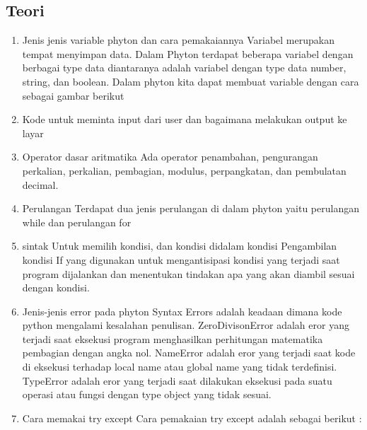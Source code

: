 \subsection{Teori}
\begin{enumerate}
    \item Jenis jenis variable phyton dan cara pemakaiannya
Variabel merupakan tempat menyimpan data. Dalam Phyton terdapat beberapa variabel dengan berbagai type data diantaranya adalah variabel dengan type data number, string, dan boolean. Dalam phyton kita dapat membuat variable dengan cara sebagai gambar berikut
   
    \item Kode untuk meminta input dari user dan bagaimana melakukan output ke layar
 
    \item Operator dasar aritmatika
Ada operator penambahan, pengurangan perkalian, perkalian, pembagian, modulus, perpangkatan, dan pembulatan decimal.

    \item Perulangan
Terdapat dua jenis perulangan di dalam phyton yaitu perulangan while dan perulangan for
 
 
    \item sintak Untuk memilih kondisi, dan kondisi didalam kondisi
Pengambilan kondisi If yang digunakan untuk mengantisipasi kondisi yang terjadi saat program dijalankan dan menentukan tindakan apa yang akan diambil sesuai dengan kondisi.
  
  
  

    \item Jenis-jenis error pada phyton
Syntax Errors adalah keadaan dimana kode python mengalami kesalahan penulisan. 
ZeroDivisonError adalah eror yang terjadi saat eksekusi program menghasilkan perhitungan matematika pembagian dengan angka nol.
NameError adalah eror yang terjadi saat kode di eksekusi terhadap local name atau global name yang tidak terdefinisi. 
TypeError adalah eror yang terjadi saat dilakukan eksekusi pada suatu operasi atau fungsi dengan type object yang tidak sesuai.

    \item Cara memakai try except
Cara pemakaian try except adalah sebagai berikut :


\end{enumerate}

